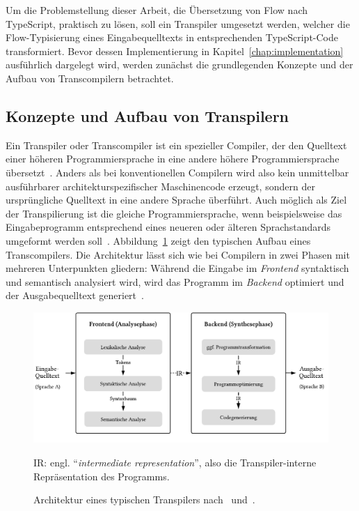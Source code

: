 Um die Problemstellung dieser Arbeit, die Übersetzung von Flow nach TypeScript, praktisch zu lösen, soll ein Transpiler umgesetzt werden, welcher die Flow-Typisierung eines Eingabequelltexts in entsprechenden TypeScript-Code transformiert. Bevor dessen Implementierung in Kapitel~\ref{chap:implementation} ausführlich dargelegt wird, werden zunächst die grundlegenden Konzepte und der Aufbau von Transcompilern betrachtet.

\subsection{Konzepte und Aufbau von Transpilern}
\label{sec:transpiler-concepts}

Ein Transpiler oder Transcompiler ist ein spezieller Compiler, der den Quelltext einer höheren Programmiersprache in eine andere höhere Programmiersprache übersetzt~\autocite[3]{AHO:COMPILERS}. Anders als bei konventionellen Compilern wird also kein unmittelbar ausführbarer architekturspezifischer Maschinencode erzeugt, sondern der ursprüngliche Quelltext in eine andere Sprache überführt. Auch möglich als Ziel der Transpilierung ist die gleiche Programmiersprache, wenn beispielsweise das Eingabeprogramm entsprechend eines neueren oder älteren Sprachstandards umgeformt werden soll~\autocite{EVGENIY:2016}. Abbildung~\ref{fig:transpiler-architecture} zeigt den typischen Aufbau eines Transcompilers. Die Architektur lässt sich wie bei Compilern in zwei Phasen mit mehreren Unterpunkten gliedern: Während die Eingabe im \emph{Frontend} syntaktisch und semantisch analysiert wird, wird das Programm im \emph{Backend} optimiert und der Ausgabequelltext generiert~\autocite[136]{APPEL:2003}.

\begin{figure}[htb]
  \includegraphics[width=\textwidth]{src/2_Grundlagen/fig/transpiler-architecture.pdf}
  \caption*{IR: engl. \enquote{\textit{intermediate representation}}, also die Transpiler-interne Repräsentation des Programms.}
  \caption{Architektur eines typischen Transpilers nach~\autocite{EVGENIY:2016} und~\autocite[8]{TORCZON:2007}.}
	\label{fig:transpiler-architecture}
\end{figure}

